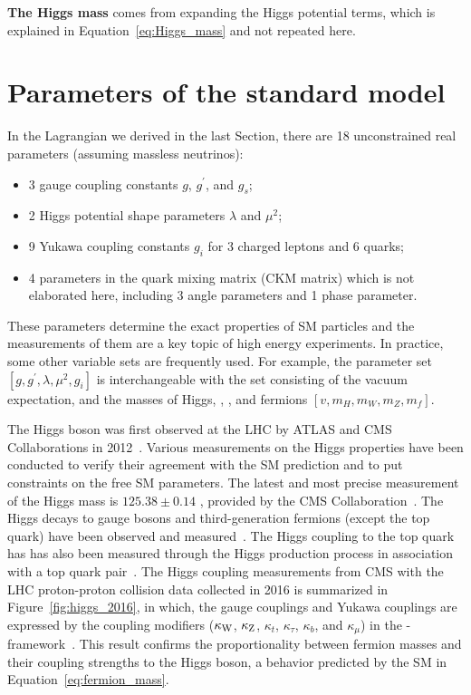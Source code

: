 \textbf{The Higgs mass} comes from expanding the Higgs potential terms, 
which is explained in Equation~\ref{eq:Higgs_mass} and not repeated here.



\section{Parameters of the standard model}\label{sec:SM_parameters}

In the Lagrangian we derived in the last Section, there are 18 unconstrained real parameters (assuming massless neutrinos):
\begin{itemize}
  \item 3 gauge coupling constants $g$, $g^{\prime}$, and $g_{s}$;
  \item 2 Higgs potential shape parameters $\lambda$ and $\mu^{2}$;
  \item 9 Yukawa coupling constants $g_{i}$ for 3 charged leptons and 6 quarks;
  \item 4 parameters in the quark mixing matrix (CKM matrix) which is not elaborated here, including 3 angle parameters and 1 phase parameter.
\end{itemize}
These parameters determine the exact properties of SM particles and the measurements of them are a key topic of high energy experiments. 
In practice, some other variable sets are frequently used. 
For example, the parameter set $[g, g^{\prime}, \lambda, \mu^{2}, g_{i}]$ is interchangeable with 
the set consisting of the vacuum expectation, and the masses of Higgs, \PW, \PZ, and fermions $[v, m_{H}, m_{W}, m_{Z}, m_{f}]$.


The Higgs boson was first observed at the LHC by ATLAS and CMS Collaborations in 2012~\cite{Aad:2012tfa, Chatrchyan:2012xdj, Chatrchyan:2013lba}.
Various measurements on the Higgs properties have been conducted to verify their agreement with the SM prediction and to put constraints on the free SM parameters.
The latest and most precise measurement of the Higgs mass is $125.38 \pm 0.14$ \GeV, provided by the CMS Collaboration~\cite{2020135425}. 
The Higgs decays to gauge bosons and third-generation fermions (except the top quark) have been observed 
and measured~\cite{Sirunyan:2312121, 201996, Sirunyan:2017exp, PhysRevLett.121.121801, 2018283, PhysRevD.99.072001, 201859, 2019508, Aaboud_2018}.
The Higgs coupling to the top quark has has also been measured through the Higgs production process in association with a top quark pair~\cite{PhysRevLett.120.231801, 2018173}.
The Higgs coupling measurements from CMS with the LHC proton-proton collision data collected in 2016 is summarized in Figure~\ref{fig:higgs_2016},
in which, the gauge couplings and Yukawa couplings are expressed by the coupling modifiers 
($\kappa_{\mathrm{W}}$, $\kappa_{\mathrm{Z}}$, $\kappa_{t}$, $\kappa_{\tau}$, $\kappa_{b}$, and $\kappa_{\mu}$) in the \kappa-framework~\cite{Heinemeyer:2013tqa}.
This result confirms the proportionality between fermion masses and their coupling strengths to the Higgs boson,
a behavior predicted by the SM in Equation~\ref{eq:fermion_mass}.

